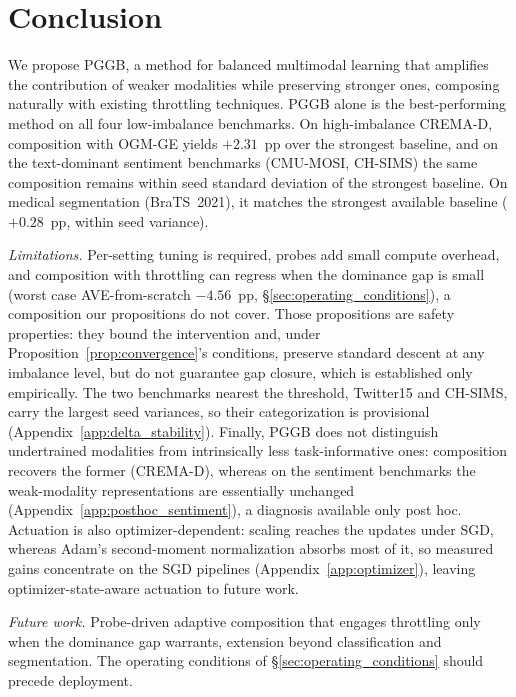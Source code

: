 \documentclass{article}
\begin{document}
\section{Conclusion}
\label{sec:conclusion}

We propose PGGB, a method for balanced multimodal learning that amplifies the contribution of weaker modalities while preserving stronger ones, composing naturally with existing throttling techniques. PGGB alone is the best-performing method on all four low-imbalance benchmarks. On high-imbalance CREMA-D, composition with OGM-GE yields $+2.31$~pp over the strongest baseline, and on the text-dominant sentiment benchmarks (CMU-MOSI, CH-SIMS) the same composition remains within seed standard deviation of the strongest baseline. On medical segmentation (BraTS~2021), it matches the strongest available baseline ($+0.28$~pp, within seed variance).

\emph{Limitations.} Per-setting tuning is required, probes add small compute overhead, and composition with throttling can regress when the dominance gap is small (worst case AVE-from-scratch $-4.56$~pp, \S\ref{sec:operating_conditions}), a composition our propositions do not cover. Those propositions are safety properties: they bound the intervention and, under Proposition~\ref{prop:convergence}'s conditions, preserve standard descent at any imbalance level, but do not guarantee gap closure, which is established only empirically. The two benchmarks nearest the threshold, Twitter15 and CH-SIMS, carry the largest seed variances, so their categorization is provisional (Appendix~\ref{app:delta_stability}). Finally, PGGB does not distinguish undertrained modalities from intrinsically less task-informative ones: composition recovers the former (CREMA-D), whereas on the sentiment benchmarks the weak-modality representations are essentially unchanged (Appendix~\ref{app:posthoc_sentiment}), a diagnosis available only post hoc. Actuation is also optimizer-dependent: scaling reaches the updates under SGD, whereas Adam's second-moment normalization absorbs most of it, so measured gains concentrate on the SGD pipelines (Appendix~\ref{app:optimizer}), leaving optimizer-state-aware actuation to future work.

\emph{Future work.} Probe-driven adaptive composition that engages throttling only when the dominance gap warrants, extension beyond classification and segmentation. The operating conditions of \S\ref{sec:operating_conditions} should precede deployment.
\end{document}
